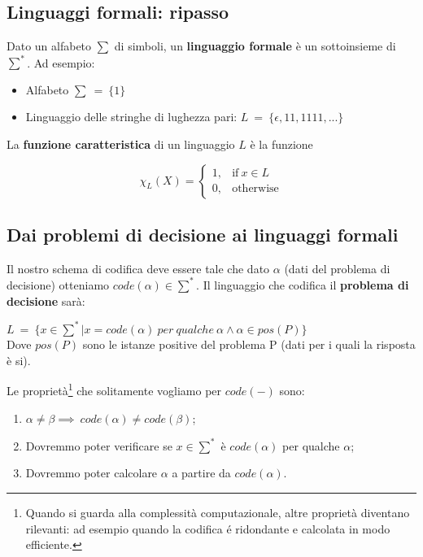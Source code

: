 \documentclass[a4paper, 12pt]{article}
\begin{document}
\subsection{Linguaggi formali: ripasso}
Dato un alfabeto $\sum$ di simboli, un \textbf{linguaggio formale} \`e un sottoinsieme di $\sum^{*}$. Ad esempio:
\begin{itemize}
\item Alfabeto $\sum\ =\ \{1\}$
\item Linguaggio delle stringhe di lughezza pari: $L\ =\ \{\epsilon, 11,1111,...\}$
\end{itemize}
La \textbf{funzione caratteristica} di un linguaggio $L$ \`e la funzione \begin{center}
\begin{equation}
\chi_{L}(X) =
	\begin{cases}
		1, & \text{if}\ x \in L \\
      	0, & \text{otherwise}
	\end{cases}
\end{equation}
\end{center}
\subsection{Dai problemi di decisione ai linguaggi formali}
Il nostro schema di codifica deve essere tale che dato $\alpha$ (dati del problema di decisione) otteniamo $code(\alpha) \in \sum^{*}$. Il linguaggio che codifica il \textbf{problema di decisione} sar\`a:
\begin{center}
$L\ =\ \{x \in \sum^{*} | x=code(\alpha)\ per\ qualche\  \alpha \land \alpha \in pos(P) \}$\\
Dove $pos(P)$ sono le istanze positive del problema P (dati per i quali la risposta \`e si).
\end{center}
Le propriet\`a\footnote{Quando si guarda alla complessità computazionale, altre proprietà
diventano rilevanti: ad esempio quando la codifica é ridondante e calcolata
in modo efficiente.} che solitamente vogliamo per $code(-)$ sono:
\begin{enumerate}
\item $\alpha \neq \beta \implies\ code(\alpha) \neq code(\beta) $;
\item Dovremmo poter verificare se $x \in \sum^{*}$ \`e $code(\alpha)$ per qualche $\alpha$;
\item Dovremmo poter calcolare $\alpha$ a partire da $code(\alpha)$.
\end{enumerate}
\end{document}
